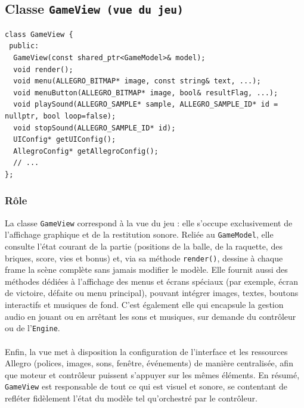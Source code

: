 \documentclass[12pt]{article}
\begin{document}


\subsection{Classe \texttt{GameView (vue du jeu)}}

\begin{lstlisting}
class GameView {
 public:
  GameView(const shared_ptr<GameModel>& model);
  void render();
  void menu(ALLEGRO_BITMAP* image, const string& text, ...);
  void menuButton(ALLEGRO_BITMAP* image, bool& resultFlag, ...);
  void playSound(ALLEGRO_SAMPLE* sample, ALLEGRO_SAMPLE_ID* id = nullptr, bool loop=false);
  void stopSound(ALLEGRO_SAMPLE_ID* id);
  UIConfig* getUIConfig();
  AllegroConfig* getAllegroConfig();
  // ...
};

\end{lstlisting}


\subsubsection* {Rôle}


La classe \colorbox{gray!20}{\texttt{GameView}} correspond à la vue du jeu : elle s’occupe exclusivement de l’affichage graphique et de la restitution sonore. Reliée au \colorbox{gray!20}{\texttt{GameModel}}, elle consulte l’état courant de la partie (positions de la balle, de la raquette, des briques, score, vies et bonus) et, via sa méthode \colorbox{gray!20}{\texttt{render()}}, dessine à chaque frame la scène complète sans jamais modifier le modèle. Elle fournit aussi des méthodes dédiées à l’affichage des menus et écrans spéciaux (par exemple, écran de victoire, défaite ou menu principal), pouvant intégrer images, textes, boutons interactifs et musiques de fond. C’est également elle qui encapsule la gestion audio en jouant ou en arrêtant les sons et musiques, sur demande du contrôleur ou de l’\colorbox{gray!20}{\texttt{Engine}}. 

\paragraph{}
Enfin, la vue met à disposition la configuration de l’interface et les ressources Allegro (polices, images, sons, fenêtre, événements) de manière centralisée, afin que moteur et contrôleur puissent s’appuyer sur les mêmes éléments. En résumé, \colorbox{gray!20}{\texttt{GameView}} est responsable de tout ce qui est visuel et sonore, se contentant de refléter fidèlement l’état du modèle tel qu’orchestré par le contrôleur.
\end{document}

